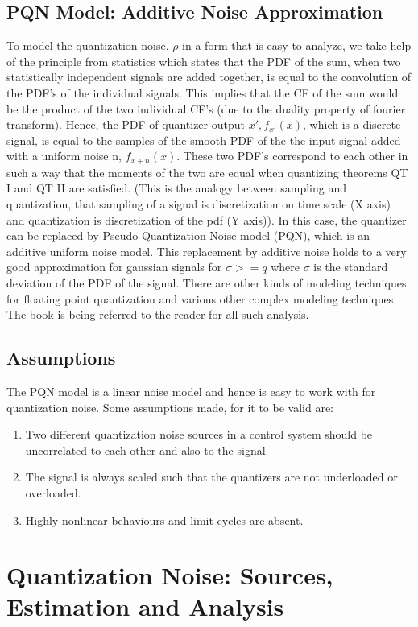 \documentclass[colorlinks=true,pdfstartview=FitV,linkcolor=blue,
            citecolor=red,urlcolor=magenta]{ligodoc}
\begin{document}
\subsection{PQN Model: Additive Noise Approximation} To model the quantization noise, $\rho$ in a form that is easy to analyze, we take help of the principle from statistics which states that the PDF of the sum, when two statistically independent signals are added together, is equal to the convolution of the PDF's of the individual signals. This implies that the CF of the sum would be the product of the two individual CF's (due to the duality property of fourier transform).
Hence, the PDF of quantizer output $x', f_{x'}(x)$, which is a discrete signal, is equal to the samples of the smooth PDF of the the input signal added with a uniform noise n, $f_{x+n}(x)$. These two PDF's correspond to each other in such a way that the moments of the two are equal when quantizing theorems QT I and QT II are satisfied. (This is the analogy between sampling and quantization, that sampling of a signal is discretization on time scale (X axis) and quantization is discretization of the pdf (Y axis)). In this case, the quantizer can be replaced by Pseudo Quantization Noise model (PQN), which is an additive uniform noise model. This replacement by additive noise holds to a very good approximation for gaussian signals for $\sigma >= q$ where $\sigma$ is the standard deviation of the PDF of the signal. There are other kinds of modeling techniques for floating point quantization and various other complex modeling techniques. The book \cite{Kollar} is being referred to the reader for all such analysis.
	\subsection{Assumptions}
	The PQN model is a linear noise model and hence is easy to work with for quantization noise. Some assumptions made, for it to be valid are:
	\begin{enumerate}
		\item Two different quantization noise sources in a control system should be uncorrelated to each other and also to the signal.
		\item The signal is always scaled such that the quantizers are not underloaded or overloaded.
		\item Highly nonlinear behaviours and limit cycles are absent.

	\end{enumerate}

\section{Quantization Noise: Sources, Estimation and Analysis}
\label{analysis}
\end{document}
